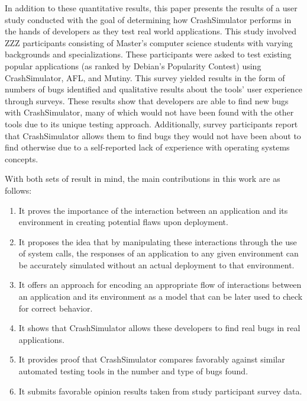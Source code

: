 In addition to these quantitative results, this paper presents the results
of a user study conducted with the goal of determining how CrashSimulator
performs in the hands of developers as they test real world applications.
This study involved ZZZ participants consisting of Master's computer
science students with varying backgrounds and specializations.  These
participants were asked to test existing popular applications (as ranked by
Debian's Popularity Contest) using CrashSimulator, AFL, and Mutiny.  This
survey yielded results in the form of numbers of bugs identified and
qualitative results about the tools' user experience through surveys.
These results show that developers are able to find new bugs with
CrashSimulator, many of which would not have been found with the other
tools due to its unique testing approach.  Additionally, survey
participants report that CrashSimulator allows them to find bugs they would
not have been about to find otherwise due to a self-reported lack of
experience with operating systems concepts.

With both sets of result in mind, the main contributions in this work are
as follows:

\begin{enumerate}

\item{It proves the importance of the interaction between an application
and its environment in creating potential flaws upon deployment.}

\item{It proposes the idea that by manipulating these interactions through
the use of system calls, the responses of an application to any given
environment can be accurately simulated without an actual
deployment to that environment.}

\item{It offers an approach for encoding an appropriate flow of
interactions between an application and its environment as a model that
can be later used to check for correct behavior.}

\item{It shows that CrashSimulator allows these developers to find real
bugs in real applications.}

\item{It provides proof that CrashSimulator compares favorably against
similar automated testing tools in the number and type of bugs found.}

\item{It submits favorable opinion results taken from study participant
survey data.}

\end{enumerate}
